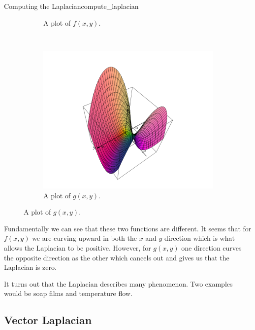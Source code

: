 \begin{ex}{Computing the Laplacian}{compute_laplacian}
\begin{figure}[H]
\begin{subfigure}[h]{.45\textwidth}
                   \caption{A plot of $f(x,y).$}
                   \end{subfigure}
                   ~
                   \begin{subfigure}[h]{.45\textwidth}
                   \includegraphics[width=\textwidth]{Figures_Part_6/0_laplace.png}
                   \caption{A plot of $g(x,y).$}
                   \end{subfigure}
               \end{figure}
               Fundamentally we can see that these two functions are different.  It seems that for $f(x,y)$ we are curving upward in both the $x$ and $y$ direction which is what allows the Laplacian to be positive. However, for $g(x,y)$ one direction curves the opposite direction as the other which cancels out and gives us that the Laplacian is zero.  
               
               It turns out that the Laplacian describes many phenomenon. Two examples would be soap films and temperature flow.
               \end{ex}
       
               
               \subsection{Vector Laplacian}
               

